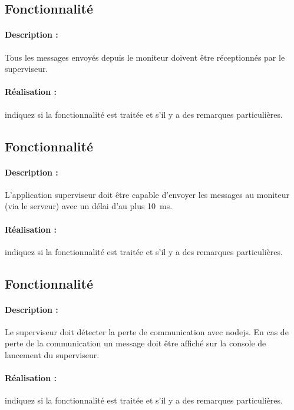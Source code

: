 \documentclass[11pt, a4paper]{paper}
\newcounter{cptreq}
\begin{document}
{\color{gray}
\subsection{Fonctionnalité \thecptreq *}

\paragraph{Description :} Tous les messages envoyés depuis le moniteur doivent être réceptionnés par le superviseur.

\paragraph{\color{black}Réalisation :}  {\color{red} indiquez si la fonctionnalité est traitée et s'il y a des remarques particulières.}
\subsection{Fonctionnalité \thecptreq *}

\paragraph{Description :} L'application superviseur doit être capable d'envoyer les messages au moniteur (via le serveur) avec un délai d'au plus 10~ms.

\paragraph{\color{black}Réalisation :}  {\color{red} indiquez si la fonctionnalité est traitée et s'il y a des remarques particulières.}
}
\subsection{Fonctionnalité \thecptreq}

\paragraph{Description :} Le superviseur doit détecter la perte de communication avec nodejs. En cas de perte de la communication un message doit être affiché sur la console de lancement du superviseur.

\paragraph{\color{black}Réalisation :}  {\color{red} indiquez si la fonctionnalité est traitée et s'il y a des remarques particulières.}
\end{document}

